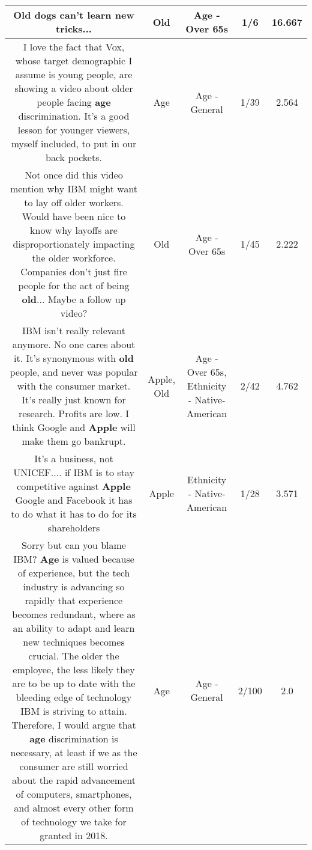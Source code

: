 \documentclass[11pt]{article}
\newlength\mylength
\begin{document}
\begin{center}
\begin{longtable}{|C{.65\mylength}|C{.30\mylength}|C{.12\mylength}|C{.12\mylength}|C{.12\mylength}|}
  \small Old dogs can't learn new tricks...\normalsize   & Old & Age - Over 65s & 1/6 & 16.667 \\  \hline
  \small I love the fact that Vox, whose target demographic I assume is young people, are showing a video about older people facing \textbf{age} discrimination. It's a good lesson for younger viewers, myself included, to put in our back pockets.\normalsize   & Age & Age - General & 1/39 & 2.564 \\  \hline
  \small Not once did this video mention why IBM might want to lay off older workers. Would have been nice to know why layoffs are disproportionately impacting the older workforce. Companies don't just fire people for the act of being \textbf{old}... Maybe a follow up video?\normalsize   & Old & Age - Over 65s & 1/45 & 2.222 \\  \hline
  \small IBM isn't really relevant anymore. No one cares about it. It's synonymous with \textbf{old} people, and never was popular with the consumer market. It's really just known for research. Profits are low. I think Google and \textbf{Apple} will make them go bankrupt.\normalsize   & Apple, Old & Age - Over 65s, Ethnicity - Native-American & 2/42 & 4.762 \\  \hline
  \small It's a business, not UNICEF.... if IBM is to stay competitive against \textbf{Apple} Google and Facebook it has to do what it has to do for its shareholders\normalsize   & Apple & Ethnicity - Native-American & 1/28 & 3.571 \\  \hline
  \small Sorry but can you blame IBM? \textbf{Age} is valued because of experience, but the tech industry is advancing so rapidly that experience becomes redundant, where as an ability to adapt and learn new techniques becomes crucial. The older the employee, the less likely they are to be up to date with the bleeding edge of technology IBM is striving to attain. Therefore, I would argue that \textbf{age} discrimination is necessary, at least if we as the consumer are still worried about the rapid advancement of computers, smartphones, and almost every other form of technology we take for granted in 2018.\normalsize   & Age & Age - General & 2/100 & 2.0 \\  \hline

\end{longtable}
\end{center}
\end{document}
